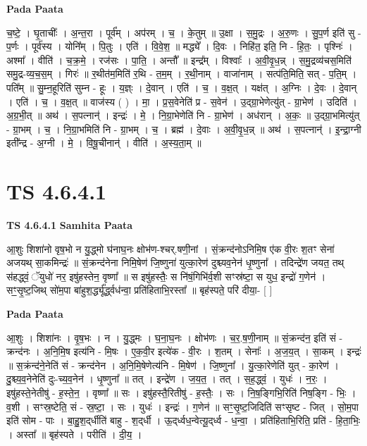 \documentclass[17pt]{extarticle}
\begin{document}
\textbf{Pada Paata} \newline

च॒ष्टे॒ । घृ॒ताचीः᳚ । अ॒न्त॒रा । पूर्व᳚म् । अप॑रम् । च॒ । के॒तुम् ॥ उ॒क्षा । स॒मु॒द्रः । अ॒रु॒णः । सु॒प॒र्ण इति॑ सु - प॒र्णः । पूर्व॑स्य । योनि᳚म् । पि॒तुः । एति॑ । वि॒वे॒श॒ ॥ मद्ध्ये᳚ । दि॒वः । निहि॑त॒ इति॒ नि - हि॒तः॒ । पृश्निः॑ । अश्मा᳚ । वीति॑ । च॒क्र॒मे॒ । रज॑सः । पा॒ति॒ । अन्तौ᳚ ॥ इन्द्र᳚म् । विश्वाः᳚ । अ॒वी॒वृ॒ध॒न्न् । स॒मु॒द्रव्य॑चस॒मिति॑ समु॒द्र-व्य॒च॒स॒म् । गिरः॑ ॥ र॒थीत॑म॒मिति॑ र॒थि - त॒म॒म् । र॒थी॒नाम् । वाजा॑नाम् । सत्प॑ति॒मिति॒ सत् - प॒ति॒म् । पति᳚म् ॥ सु॒म्न॒हूरिति॑ सुम्न - हूः । य॒ज्ञ्ः । दे॒वान् । एति॑ । च॒ । व॒क्ष॒त् । यक्ष॑त् । अ॒ग्निः । दे॒वः । दे॒वान् । एति॑ । च॒ । व॒क्ष॒त् ॥ वाज॑स्य ( ) । मा॒ । प्र॒स॒वेनेति॑ प्र - स॒वेन॑ । उ॒द्ग्रा॒भेणेत्यु॑त् - ग्रा॒भेण॑ । उदिति॑ । अ॒ग्र॒भी॒त् ॥ अथ॑ । स॒पत्नान्॑ । इन्द्रः॑ । मे॒ । नि॒ग्रा॒भेणेति॑ नि - ग्रा॒भेण॑ । अध॑रान् । अ॒कः॒ ॥ उ॒द्ग्रा॒भमित्यु॑त् - ग्रा॒भम् । च॒ । नि॒ग्रा॒भमिति॑ नि - ग्रा॒भम् । च॒ । ब्रह्म॑ । दे॒वाः । अ॒वी॒वृ॒ध॒न्न् ॥ अथ॑ । स॒पत्नान्॑ । इ॒न्द्रा॒ग्नी इती᳚न्द्र - अ॒ग्नी । मे॒ । वि॒षू॒चीनान्॑ । वीति॑ । अ॒स्य॒ता॒म् ॥  \newline





\section{ TS 4.6.4.1 }

\textbf{TS 4.6.4.1 } \newline
\textbf{Samhita Paata} \newline

आ॒शुः शिशा॑नो वृष॒भो न यु॒द्ध्मो घ॑नाघ॒नः क्षोभ॑ण-श्चर्.षणी॒नां । सं॒क्रन्द॑नोऽनिमि॒ष ए॑क वी॒रः श॒तꣳ सेना॑ अजयथ् सा॒कमिन्द्रः॑ ॥ सं॒क्रन्द॑नेना निमि॒षेण॑ जि॒ष्णुना॑ युत्का॒रेण॑ दुश्च्यव॒नेन॑ धृ॒ष्णुना᳚ । तदिन्द्रे॑ण जयत॒ तथ् स॑हद्ध्वं॒ ॅयुधो॑ नर॒ इषु॑हस्तेन॒ वृष्णा᳚ ॥ स इषु॑हस्तैः॒ स नि॑षं॒गिभि॑र्व॒शी सꣳस्र॑ष्टा॒ स युध॒ इन्द्रो॑ ग॒णेन॑ । सꣳ॒॒सृ॒ष्ट॒जिथ् सो॑म॒पा बा॑हुश॒र्द्ध्यू᳚र्द्ध्वध॑न्वा॒ प्रति॑हिताभि॒रस्ता᳚ ॥ बृह॑स्पते॒ परि॑ दीया॒- [  ] \newline

\textbf{Pada Paata} \newline

आ॒शुः । शिशा॑नः । वृ॒ष॒भः । न । यु॒द्ध्मः । घ॒ना॒घ॒नः । क्षोभ॑णः । च॒र॒.ष॒णी॒नाम् ॥ सं॒क्रन्द॑न॒ इति॑ सं - क्रन्द॑नः । अ॒नि॒मि॒ष इत्य॑नि - मि॒षः । ए॒क॒वी॒र इत्ये॑क - वी॒रः । श॒तम् । सेनाः᳚ । अ॒ज॒य॒त् । सा॒कम् । इन्द्रः॑ ॥ स॒क्रंन्द॑ने॒नेति॑ सं - क्रन्द॑नेन । अ॒नि॒मि॒षेणेत्य॑नि - मि॒षेण॑ । जि॒ष्णुना᳚ । यु॒त्का॒रेणेति॑ युत् - का॒रेण॑ । दु॒श्च्य॒व॒नेनेति॑ दुः-च्य॒व॒नेन॑ । धृ॒ष्णुना᳚ ॥ तत् । इन्द्रे॑ण । ज॒य॒त॒ । तत् । स॒ह॒द्ध्वं॒ । युधः॑ । न॒रः॒ । इषु॑हस्ते॒नेतीषु॑ - ह॒स्ते॒न॒ । वृष्णा᳚ ॥ सः । इषु॑हस्तै॒रितीषु॑ - ह॒स्तैः॒ । सः । नि॒ष॒ङ्गिभि॒रिति॑ निष॒ङ्गि - भिः॒ । व॒शी । सꣳस्र॒ष्टेति॒ सं - स्र॒ष्टा॒ । सः । युधः॑ । इन्द्रः॑ । ग॒णेन॑ ॥ सꣳ॒॒सृ॒ष्ट॒जिदिति॑ सꣳसृष्ट - जित् । सो॒म॒पा इति॑ सोम - पाः । बा॒हु॒श॒द्‌र्धीति॑ बाहु - श॒द्‌र्धी । ऊ॒द्‌र्ध्वध॒न्वेत्यू॒द्‌र्ध्व - ध॒न्वा॒ । प्रति॑हिताभि॒रिति॒ प्रति॑ - हि॒ता॒भिः॒ । अस्ता᳚ ॥ बृह॑स्पते । परीति॑ । दी॒य॒ ।  \newline
\end{document}
